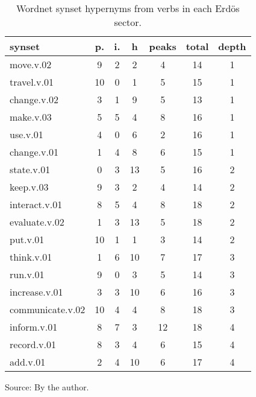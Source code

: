 \begin{table}[h!]
\begin{center}
\caption{Wordnet synset hypernyms from verbs in each Erd\"os sector.}
	\label{tab:wnvh}
\begin{tabular}{l || c | c | c || c | c | c}\hline
{\bf synset} & {\bf p.} & {\bf i.} & {\bf h} & {\bf peaks} & {\bf total} & {\bf depth} \\\hline\hline
move.v.02 & 9  & 2  & 2  & 4  & 14  & 1 \\
travel.v.01 & 10  & 0  & 1  & 5  & 15  & 1 \\
change.v.02 & 3  & 1  & 9  & 5  & 13  & 1 \\
make.v.03 & 5  & 5  & 4  & 8  & 16  & 1 \\
use.v.01 & 4  & 0  & 6  & 2  & 16  & 1 \\
change.v.01 & 1  & 4  & 8  & 6  & 15  & 1 \\\hline
state.v.01 & 0  & 3  & 13  & 5  & 16  & 2 \\
keep.v.03 & 9  & 3  & 2  & 4  & 14  & 2 \\
interact.v.01 & 8  & 5  & 4  & 8  & 18  & 2 \\
evaluate.v.02 & 1  & 3  & 13  & 5  & 18  & 2 \\
put.v.01 & 10  & 1  & 1  & 3  & 14  & 2 \\\hline
think.v.01 & 1  & 6  & 10  & 7  & 17  & 3 \\
run.v.01 & 9  & 0  & 3  & 5  & 14  & 3 \\
increase.v.01 & 3  & 3  & 10  & 6  & 16  & 3 \\
communicate.v.02 & 10  & 4  & 4  & 8  & 18  & 3 \\\hline
inform.v.01 & 8  & 7  & 3  & 12  & 18  & 4 \\
record.v.01 & 8  & 3  & 4  & 6  & 15  & 4 \\
add.v.01 & 2  & 4  & 10  & 6  & 17  & 4 \\\hline
\end{tabular}
\begin{flushleft}\footnotesize
		Source: By the author.\
\end{flushleft}
\end{center}
\end{table}
